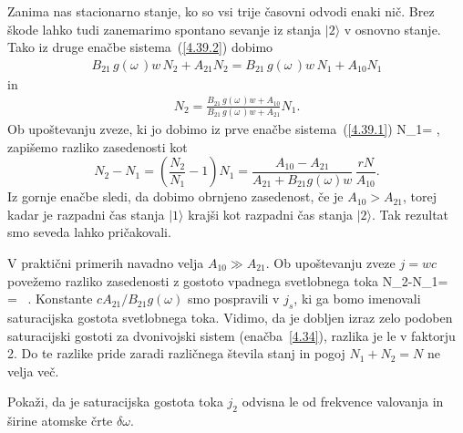 Zanima nas stacionarno stanje, ko so vsi trije časovni odvodi enaki nič. 
Brez škode lahko tudi zanemarimo spontano sevanje iz stanja
$|2\rangle$ v osnovno stanje. Tako iz druge enačbe sistema~(\ref{4.39.2}) 
dobimo
\begin{eqnarray}
B_{21}\,g(\omega\,)w\, N_{2}+A_{21}N_{2} = B_{21}\,g(\omega\,)w\, N_{1} + A_{10}N_{1} 
\end{eqnarray}
in
\begin{eqnarray}
N_2 = \frac{B_{21}\,g(\omega\,)w + A_{10}}{B_{21}\,g(\omega\,)w+A_{21}}N_1.  
\end{eqnarray}
Ob upoštevanju zveze, ki jo dobimo iz prve enačbe sistema~(\ref{4.39.1})
\beq
N_1= , 
\eeq
zapišemo razliko zasedenosti kot 
\begin{equation}
N_{2}-N_{1}=\left(\frac{N_2}{N_1}-1\right)N_1=\frac{A_{10}-A_{21}}{A_{21}+
B_{21}g(\omega)w} \,\frac{rN}{A_{10}}.
\label{4.42}
\end{equation}
Iz gornje enačbe sledi, da dobimo obrnjeno zasedenost, če je $A_{10}>A_{21}$, torej kadar je
razpadni čas stanja $|1\rangle$ krajši kot razpadni čas stanja $|2\rangle$.
Tak rezultat smo seveda lahko pričakovali.


V praktični primerih navadno velja $A_{10}\gg A_{21}$. Ob upoštevanju zveze $j=wc$ povežemo
razliko zasedenosti z gostoto vpadnega svetlobnega toka
\beq
N_{2}-N_{1}= \,  = 
 \, .
\label{eq:3n_N}
\eeq
Konstante $c A_{21}/B_{21}g(\omega)$ smo pospravili v $j_s$, ki ga bomo imenovali 
saturacijska gostota svetlobnega toka. Vidimo, da je dobljen
izraz zelo podoben saturacijski gostoti za dvonivojski sistem (enačba~\ref{4.34}), razlika je le
v faktorju 2. Do te razlike pride zaradi različnega števila stanj in pogoj $N_{1}+N_{2}=N$
ne velja več. 

\begin{definition}
 Pokaži, da je saturacijska gostota toka $j_2$ odvisna le od frekvence valovanja in širine 
 atomske črte $\delta \omega$. 
\end{definition}




